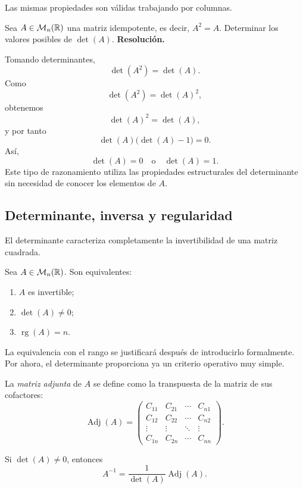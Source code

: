 Las mismas propiedades son válidas trabajando por columnas.

\begin{solvedexercise}
Sea $A\in\mathcal M_n(\mathbb{R})$ una matriz idempotente, es decir, $A^2=A$. Determinar los valores posibles de $\det(A)$.
\tcblower
\textbf{Resolución.}\par\smallskip
Tomando determinantes,
\[
\det(A^2)=\det(A).
\]
Como
\[
\det(A^2)=\det(A)^2,
\]
obtenemos
\[
\det(A)^2=\det(A),
\]
y por tanto
\[
\det(A)\bigl(\det(A)-1\bigr)=0.
\]
Así,
\[
\boxed{\det(A)=0\quad\text{o}\quad\det(A)=1.}
\]
Este tipo de razonamiento utiliza las propiedades estructurales del determinante sin necesidad de conocer los elementos de $A$.
\end{solvedexercise}

\subsection{Determinante, inversa y regularidad}

El determinante caracteriza completamente la invertibilidad de una matriz cuadrada.

\begin{theorem}
Sea $A\in\mathcal M_n(\mathbb{R})$. Son equivalentes:
\begin{enumerate}[label=\roman*)]
\item $A$ es invertible;
\item $\det(A)\neq0$;
\item $\operatorname{rg}(A)=n$.
\end{enumerate}
\end{theorem}

La equivalencia con el rango se justificará después de introducirlo formalmente. Por ahora, el determinante proporciona ya un criterio operativo muy simple.

\begin{definition}
La \emph{matriz adjunta} de $A$ se define como la transpuesta de la matriz de sus cofactores:
\[
\operatorname{Adj}(A)=
\begin{pmatrix}
C_{11}&C_{21}&\cdots&C_{n1}\\
C_{12}&C_{22}&\cdots&C_{n2}\\
\vdots&\vdots&\ddots&\vdots\\
C_{1n}&C_{2n}&\cdots&C_{nn}
\end{pmatrix}.
\]
\end{definition}

Si $\det(A)\neq0$, entonces
\[
\boxed{A^{-1}=\frac{1}{\det(A)}\operatorname{Adj}(A).}
\]

